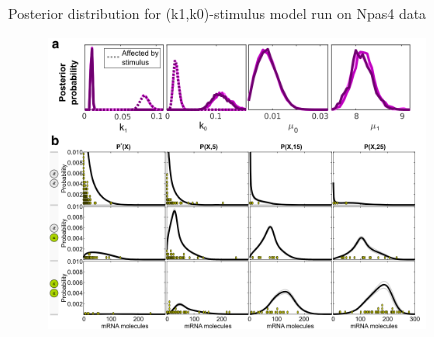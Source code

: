 \documentclass[aspectratio=1610]{beamer}					%
\begin{document}
\begin{frame}{Posterior distribution for (k1,k0)-stimulus model run on Npas4 data}

\begin{figure}
\includegraphics[width=10cm]{figure-4.png}
\end{figure}

\end{frame}
\end{document}
